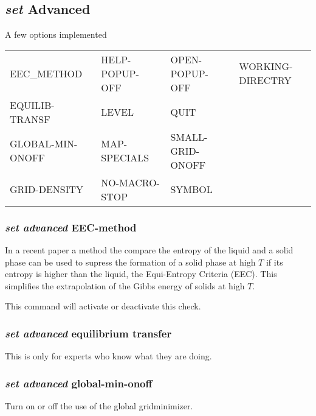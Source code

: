 \documentclass[11pt]{article}
\begin{document}
\subsection{{\em set} Advanced}

A few options implemented

{\small
\begin{tabular}{llll}
 EEC\_METHOD      & HELP-POPUP-OFF~& OPEN-POPUP-OFF~ & WORKING-DIRECTRY\\ 
 EQUILIB-TRANSF~  & LEVEL          & QUIT\\
 GLOBAL-MIN-ONOFF~& MAP-SPECIALS   & SMALL-GRID-ONOFF~\\
 GRID-DENSITY     & NO-MACRO-STOP  & SYMBOL \\
\end{tabular}
}

\hypertarget{Set adv EEC-method}{}
\subsubsection{{\em set advanced} EEC-method}\label{sc:eec-method}

In a recent paper\cite{20Sun} a method the compare the entropy of
the liquid and a solid phase can be used to supress the formation of a
solid phase at high $T$ if its entropy is higher than the liquid, the
Equi-Entropy Criteria (EEC).  This simplifies the extrapolation of the
Gibbs energy of solids at high $T$.

This command will activate or deactivate this check.

\hypertarget{Set adv transfer}{}
\subsubsection{{\em set advanced} equilibrium transfer}

This is only for experts who know what they are doing.

\hypertarget{Set adv global onoff}{}
\subsubsection{{\em set advanced} global-min-onoff}

Turn on or off the use of the global gridminimizer.

\hypertarget{Set adv grid-density}{}
\end{document}
